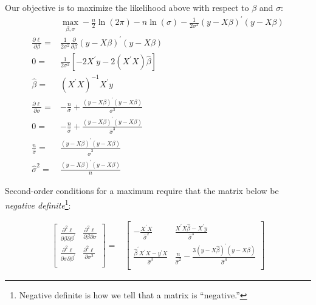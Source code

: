 \documentclass[12pt,english]{article}
\begin{document}
Our objective is to maximize the likelihood above with respect to $\beta$ and $\sigma$:
\begin{align*}
    & \max_{\beta,\sigma} -\frac{n}{2}\ln\left(2\pi\right) - n \ln \left(\sigma\right) - \frac{1}{2\sigma^{2}}\left(y-X\beta\right)^{\prime}\left(y-X\beta\right) \\
    \frac{\partial\ell}{\partial\beta} =& \frac{1}{2\sigma^{2}}\frac{\partial}{\partial\beta}\left(y-X\beta\right)^{\prime}\left(y-X\beta\right) \\
    0 =& \frac{1}{2\sigma^{2}}\left[-2X^{\prime}y -2\left(X^{\prime}X\right)\hat{\beta}\right] \\
    \hat{\beta} =& \left(X^{\prime}X\right)^{-1}X^{\prime}y \\
    \frac{\partial\ell}{\partial\sigma} =& -\frac{n}{\sigma} + \frac{\left(y-X\beta\right)^{\prime}\left(y-X\beta\right)}{\sigma^{3}} \\
    0 =& -\frac{n}{\hat{\sigma}} +  \frac{\left(y-X\beta\right)^{\prime}\left(y-X\beta\right)}{\hat{\sigma}^{3}} \\
    \frac{n}{\hat{\sigma}} =& \frac{\left(y-X\beta\right)^{\prime}\left(y-X\beta\right)}{\hat{\sigma}^{3}} \\
    \hat{\sigma}^{2} =& \frac{\left(y-X\beta\right)^{\prime}\left(y-X\beta\right)}{n} 
\end{align*}

Second-order conditions for a maximum require that the matrix below be \emph{negative definite}\footnote{Negative definite is how we tell that a matrix is ``negative.''}:

\begin{align}
    \label{eq:hess}
    \left[ {\begin{array}{cc}
                \frac{\partial^{2}\ell}{\partial\beta\partial\beta^{\prime}} & \frac{\partial^{2}\ell}{\partial\beta\partial\sigma}  \\
                \frac{\partial^{2}\ell}{\partial\sigma\partial\beta^{\prime}} & \frac{\partial^{2}\ell}{\partial\sigma^{2}}  \\
                  \end{array} } \right]
                  =&
    \left[ {\begin{array}{cc}
                - \frac{X^{\prime}X}{\hat{\sigma}^{2}} &  \frac{X^{\prime}X\hat{\beta} - X^{\prime}y}{\hat{\sigma}^{3}}  \\
                \frac{\hat{\beta}^{\prime}X^{\prime}X - y^{\prime}X}{\hat{\sigma}^{3}}  & \frac{n}{\hat{\sigma}^{2}} - \frac{3\left(y-X\hat{\beta}\right)^{\prime}\left(y-X\hat{\beta}\right)}{\hat{\sigma}^{4}}  \\
                  \end{array} } \right]
              \end{align}
\end{document}
